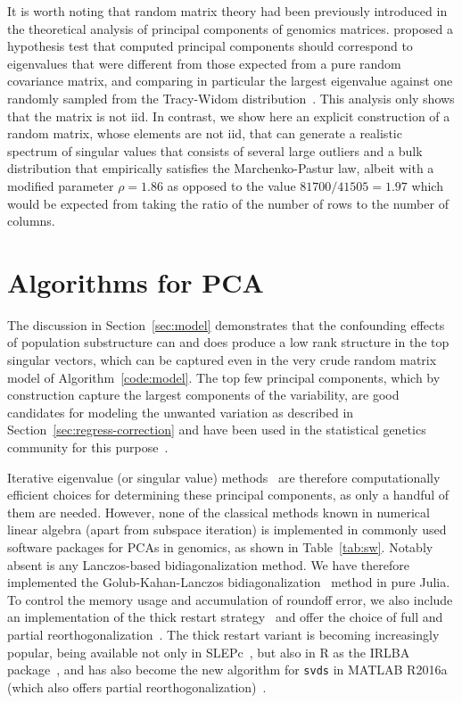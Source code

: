\documentclass[review]{siamart0516}
\begin{document}
It is worth noting that random matrix theory had been previously introduced in
the theoretical analysis of principal components of genomics matrices.
\cite{Patterson2006} proposed a hypothesis test that computed principal components
should correspond to eigenvalues that were different from those expected from a
pure random covariance matrix,
and comparing in particular the largest eigenvalue against one randomly sampled
from the Tracy-Widom distribution~\cite{Tracy1993,Tracy1994}.
This analysis only shows that the matrix is not iid. In contrast, we show here
an explicit construction of a random matrix, whose elements are not iid, that
can generate a realistic spectrum of singular values that consists of several
large outliers and a bulk distribution that empirically satisfies the
Marchenko-Pastur law, albeit with a modified parameter $\rho = 1.86$ as opposed
to the value $81700/41505=1.97$ which would be expected from taking the ratio of
the number of rows to the number of columns.


\section{Algorithms for PCA}

The discussion in Section~\ref{sec:model} demonstrates that the confounding
effects of population substructure can and does produce a low rank structure in
the top singular vectors, which can be captured even in the very crude random
matrix model of Algorithm~\ref{code:model}. The top few principal components,
which by construction capture the largest components of the variability, are
good candidates for modeling the unwanted variation as described in
Section~\ref{sec:regress-correction} and have been used in the statistical
genetics community for this
purpose~\cite{Chen2003,Patterson2006,Price2006,Zhu2002,Zhang2003}.

Iterative eigenvalue (or singular value)
methods~\cite{Bai2000} are therefore computationally efficient choices for
determining these principal components, as only a handful of them are needed.
However, none of the classical methods known in numerical linear algebra
(apart from subspace iteration) is implemented in commonly used software packages
for PCAs in genomics, as shown in Table~\ref{tab:sw}.
Notably absent is any Lanczos-based bidiagonalization method.
We have therefore implemented the Golub-Kahan-Lanczos bidiagonalization~\cite{Golub1965}
method in pure Julia\cite{Bezanson2012,Bezanson2015}.
To control the memory usage and accumulation of
roundoff error, we also include an implementation of the thick restart
strategy~\cite{Stewart2001,Baglama2005} and offer the choice of full and
partial reorthogonalization~\cite{Simon1984,Larsen1998}. The thick restart
variant is becoming increasingly popular, being available not only in
SLEPc~\cite{Hernandez2008}, but also in R as the
IRLBA package~\cite{cran-irlba}, and has also become the new algorithm for \verb|svds| in
\textsc{MATLAB} R2016a (which also offers partial reorthogonalization)~\cite{matlab-r2016a}.
\end{document}
